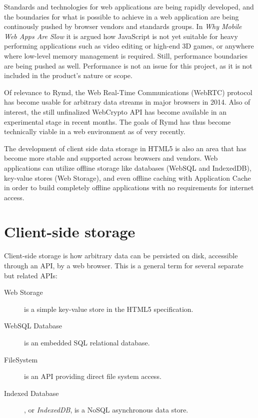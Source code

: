 Standards and technologies for web applications are being rapidly developed, and the boundaries for what is possible to achieve in a web application are being continously pushed by browser vendors and standards groups. In \emph{Why Mobile Web Apps Are Slow} \cite{MobileApps:Online} it is argued how JavaScript is not yet suitable for heavy performing applications such as video editing or high-end 3D games, or anywhere where low-level memory management is required. Still, performance boundaries are being pushed as well. Performance is not an issue for this project, as it is not included in the product's nature or scope.

Of relevance to Rymd, the Web Real-Time Communications (WebRTC) protocol \cite{WebRTC:Online} has become usable for arbitrary data streams in major browsers in 2014\cite{WebRTCChrome:Online}\cite{WebRTCFirefox:Online}. Also of interest, the still unfinalized WebCrypto API \cite{WebCrypto:Online} has become available in an experimental stage in recent months. The goals of Rymd has thus become technically viable in a web environment as of very recently.

The development of client side data storage in HTML5 is also an area that has become more stable and supported across browsers and vendors. Web applications can utilize offline storage like databases (WebSQL and IndexedDB), key-value stores (Web Storage), and even offline caching with Application Cache \cite{OfflineWebApps:Online} in order to build completely offline applications with no requirements for internet access.

\section{Client-side storage}

Client-side storage is how arbitrary data can be persisted on disk, accessible through an API, by a web browser. This is a general term for several separate but related APIs:

\begin{description}
  \item[Web Storage]\cite{WebStorage:Online} is a simple key-value store in the HTML5 specification.
  \item[WebSQL Database]\cite{WebSQL:Online} is an embedded SQL relational database.
  \item[FileSystem]\cite{FileSystem:Online} is an API providing direct file system access.
  \item[Indexed Database]\cite{IndexedDB:Online}, or \emph{IndexedDB}, is a NoSQL asynchronous data store.
\end{description}

